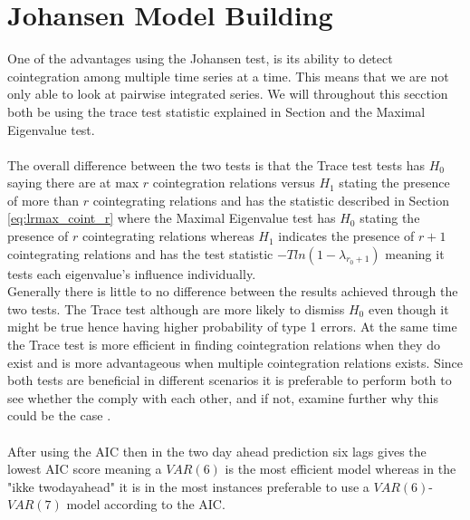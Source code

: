 \section{Johansen Model Building}
One of the advantages using the Johansen test, is its ability to detect cointegration among multiple time series at a time. This means that we are not only able to look at pairwise integrated series. We will throughout this secction both be using the trace test statistic explained in Section \cite{Johansen_test} and the Maximal Eigenvalue test. \\\\
The overall difference between the two tests is that the Trace test tests has $H_0$ saying there are at max $r$ cointegration relations versus $H_1$ stating the presence of more than $r$ cointegrating relations and has the statistic described in Section \cite{Johansen_test} \eqref{eq:lrmax_coint_r} where the Maximal Eigenvalue test has $H_0$ stating the presence of $r$ cointegrating relations whereas $H_1$ indicates the presence of $r+1$ cointegrating relations and has the test statistic $-Tln(1-\lambda_{r_0+1})$ meaning it tests each eigenvalue's influence individually.\\
Generally there is little to no difference between the results achieved through the two tests. The Trace test although are more likely to dismiss $H_0$ even though it might be true hence having higher probability of type 1 errors. At the same time the Trace test is more efficient in finding cointegration relations when they do exist and is more advantageous when multiple cointegration relations exists. Since both tests are beneficial in different scenarios it is preferable to perform both to see whether the comply with each other, and if not, examine further why this could be the case \citep{johansentestdifferences}.\\\\
After using the AIC then in the two day ahead prediction six lags gives the lowest AIC score meaning a $VAR(6)$ is the most efficient model whereas in the "ikke twodayahead" it is in the most instances preferable to use a $VAR(6)$-$VAR(7)$ model according to the AIC.


